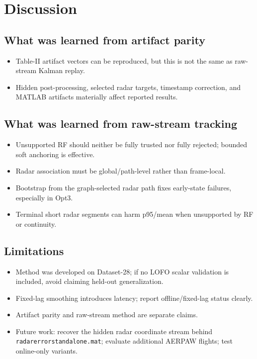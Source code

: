 \documentclass[10pt,conference]{IEEEtran}
\begin{document}
\section{Discussion}
\label{sec:discussion}

\subsection{What was learned from artifact parity}
\begin{itemize}[leftmargin=*]
  \item Table-II artifact vectors can be reproduced, but this is not the same as raw-stream Kalman replay.
  \item Hidden post-processing, selected radar targets, timestamp correction, and MATLAB artifacts materially affect reported results.
\end{itemize}

\subsection{What was learned from raw-stream tracking}
\begin{itemize}[leftmargin=*]
  \item Unsupported RF should neither be fully trusted nor fully rejected; bounded soft anchoring is effective.
  \item Radar association must be global/path-level rather than frame-local.
  \item Bootstrap from the graph-selected radar path fixes early-state failures, especially in Opt3.
  \item Terminal short radar segments can harm p95/mean when unsupported by RF or continuity.
\end{itemize}

\subsection{Limitations}
\begin{itemize}[leftmargin=*]
  \item Method was developed on Dataset-28; if no LOFO scalar validation is included, avoid claiming held-out generalization.
  \item Fixed-lag smoothing introduces latency; report offline/fixed-lag status clearly.
  \item Artifact parity and raw-stream method are separate claims.
  \item Future work: recover the hidden radar coordinate stream behind \texttt{radarerrorstandalone.mat}; evaluate additional AERPAW flights; test online-only variants.
\end{itemize}
\end{document}
